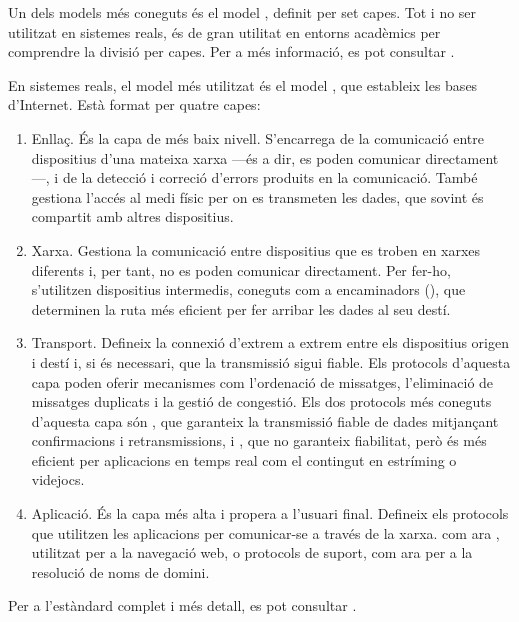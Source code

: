 \documentclass{tfgitic}[2024/07/01]
\begin{document}
Un dels models més coneguts és el model , definit per set capes. Tot i no ser utilitzat en sistemes reals, és de gran utilitat 
en entorns acadèmics per comprendre la divisió per capes. Per a més informació, es pot consultar \cite{noauthor_isoiec_1994}.

En sistemes reals, el model més utilitzat és el model , que estableix les bases d'Internet. Està format per quatre capes:
\begin{enumerate}
    \item Enllaç. És la capa de més baix nivell. S'encarrega de la comunicació entre dispositius d'una mateixa xarxa ---és a dir, es poden comunicar directament---, i
    de la detecció i correció d'errors produits en la comunicació. També gestiona l'accés al medi físic per on es transmeten les dades, 
    que sovint és compartit amb altres dispositius.
    \item Xarxa. Gestiona la comunicació entre dispositius que es troben en xarxes diferents i, per tant, no es poden comunicar directament. 
    Per fer-ho, s'utilitzen dispositius intermedis, coneguts com a encaminadors (), 
    que determinen la ruta més eficient per fer arribar les dades al seu destí.
    \item Transport. Defineix la connexió d'extrem a extrem entre els dispositius origen i destí i, si és necessari, que la transmissió sigui fiable. 
    Els protocols d'aquesta capa poden oferir mecanismes com l'ordenació de missatges, l'eliminació de missatges duplicats i la gestió de congestió. 
    Els dos protocols més coneguts d'aquesta capa són , que garanteix la transmissió fiable de dades mitjançant confirmacions i retransmissions,
    i , que no garanteix fiabilitat, però és més eficient per aplicacions en temps real com el contingut en estríming o videjocs.
    \item Aplicació. És la capa més alta i propera a l'usuari final. Defineix els protocols que utilitzen les aplicacions per comunicar-se a través de la xarxa.
    com ara , utilitzat per a la navegació web, o protocols de suport, com ara  per a la resolució de noms de domini.
\end{enumerate}

Per a l'estàndard complet i més detall, es pot consultar \cite{braden_requirements_1989}. 

\end{document}
